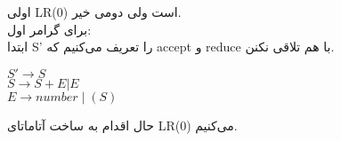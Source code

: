 

اولی LR(0) است ولی دومی خیر.
\\
برای گرامر اول:
\\
ابتدا S' را تعریف می‌کنیم که accept و reduce با هم تلاقی نکنن.

\begin{latin}
\begin{center}
$S' \rightarrow S$
\\
$S \rightarrow S + E | E$
\\
$E \rightarrow number \; | \; (S)$
\\
\end{center}
\end{latin}


حال اقدام به ساخت آتاماتای LR(0) می‌کنیم.
\\

